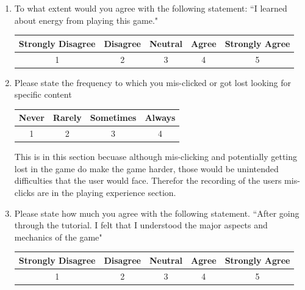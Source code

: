 \documentclass[msc,oneside]{ubcthesis}%
\begin{document}
\begin{enumerate}
      \item To what extent would you agree with the following statement: ``I learned about energy from playing  this game."

      \begin{table}[tbph]
        \centering        
        \label{table:learning}
        \begin{tabular}{|c|c|c|c|c|}
          \hline
          Strongly Disagree & Disagree & Neutral & Agree & Strongly Agree \\ \hline
          1 & 2 & 3 & 4 & 5 \\ \hline
        \end{tabular}
      \end{table}

      \item Please state the frequency to which you mis-clicked or got lost looking for specific content
      
      \begin{table}[tbph]
        \centering        
        \label{table:misClick}
        \begin{tabular}{|c|c|c|c|}
          \hline
          Never & Rarely & Sometimes & Always \\ \hline
          1 & 2 & 3 & 4 \\ \hline
        \end{tabular}
      \end{table}
      
      This is in this section becuase although mis-clicking and potentially getting lost in the game do make the game harder, those would be unintended difficulties that the user would face. Therefor the recording of the users mis-clicks are in the playing experience section. 

      \newpage
      \item Please state how much you agree with the following statement. ``After going through the tutorial. I felt that I understood the major aspects and mechanics of the game"
      \bigskip
      \begin{table}[tbph]
        \centering        
        \label{table:tutorial}
        \begin{tabular}{|c|c|c|c|c|}
          \hline
          Strongly Disagree & Disagree & Neutral & Agree & Strongly Agree \\ \hline
          1 & 2 & 3 & 4 & 5 \\ \hline
        \end{tabular}
      \end{table}


\end{enumerate}
\end{document}
